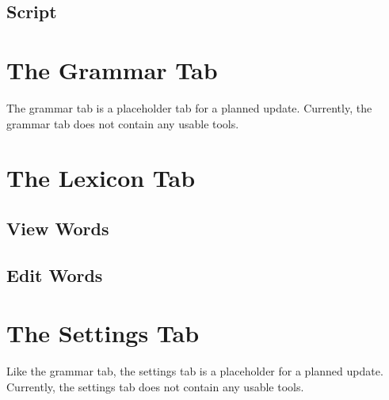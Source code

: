 \documentclass{report}
\begin{document}
	\section{Script}
	
	\chapter{The Grammar Tab}
	The grammar tab is a placeholder tab for a planned update. Currently, the grammar tab
	does not contain any usable tools.
	
	\chapter{The Lexicon Tab}
	\section{View Words}
	\section{Edit Words}
	
	\chapter{The Settings Tab}
	Like the grammar tab, the settings tab is a placeholder for a planned update. Currently,
	the settings tab does not contain any usable tools.
	
\end{document}
